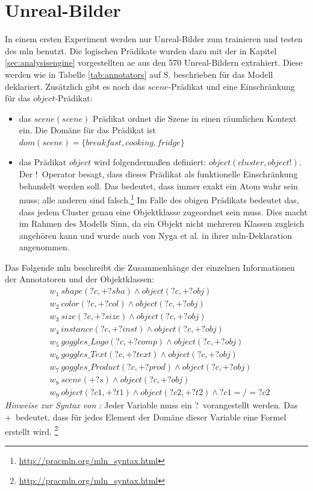 \section{Unreal-Bilder}
\label{sec:onlyUnrealImages}
In einem ersten Experiment werden nur Unreal-Bilder zum trainieren und testen des \gls{mln} benutzt. Die logischen Prädikate wurden dazu mit der in Kapitel \ref{sec:analysisengine} vorgestellten \gls{ae} aus den 570 Unreal-Bildern extrahiert. Diese werden wie in Tabelle \ref{tab:annotators} auf S.\pageref{tab:annotators} beschrieben für das Modell deklariert. Zusätzlich gibt es noch das $scene$-Prädikat und eine Einschränkung für das $object$-Prädikat:
\begin{itemize}
\item das $scene(scene)$ Prädikat ordnet die Szene in einen räumlichen Kontext ein. Die Domäne für das Prädikat ist $dom(scene) = \{breakfast, cooking, fridge\}$
\item das Prädikat $object$ wird folgendermaßen definiert: $object(cluster, object!)$. Der \glqq!\grqq \ Operator besagt, dass dieses Prädikat als funktionelle Einschränkung behandelt werden soll. Das bedeutet, dass immer exakt ein Atom wahr sein muss; alle anderen sind falsch.\footnote{\url{http://pracmln.org/mln_syntax.html}} Im Falle des obigen Prädikats bedeutet das, dass jedem Cluster genau eine Objektklasse zugeordnet sein muss. Dies macht im Rahmen des Modells Sinn, da ein Objekt nicht mehreren Klassen zugleich angehören kann und wurde auch von Nyga et al.\cite{pr2looking} in ihrer \gls{mln}-Deklaration angenommen.
\end{itemize}
Das Folgende \gls{mln} beschreibt die Zusammenhänge der einzelnen Informationen der Annotatoren und der Objektklassen:
\begin{align*}
& w_{1} \ shape(?c, +?sha) \wedge object(?c, +?obj) \\
& w_{2} \ color(?c, +?col) \wedge object(?c, +?obj) \\
& w_{3} \ size(?c, +?size) \wedge object(?c, +?obj) \\
& w_{4} \ instance(?c, +?inst) \wedge object(?c, +?obj) \\
& w_{5} \ goggles\_Logo(?c, +?comp) \wedge object(?c, +?obj)\\
& w_{6} \ goggles\_Text(?c, +?text) \wedge object(?c, +?obj)\\
& w_{7} \ goggles\_Product(?c, +?prod) \wedge object(?c, +?obj)\\
& w_{8} \ scene(+?s) \wedge object(?c, +?obj)\\
& w_{9} \ object(?c1, +?t1) \wedge object(?c2, +?t2) \wedge ?c1 =/= ?c2
\end{align*}
\textit{Hinweise zur Syntax von \pracmln:} Jeder Variable muss ein \glqq ?\grqq \ vorangestellt werden. Das \glqq +\grqq \ bedeutet, dass für jedes Element der Domäne dieser Variable eine Formel erstellt wird. \footnote{\url{http://pracmln.org/mln_syntax.html}}  \par
 
